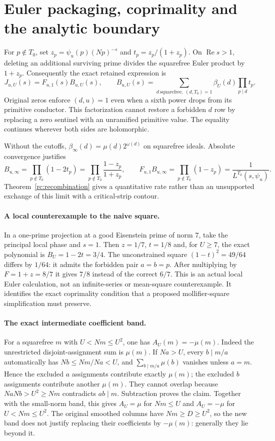 \section{Euler packaging, coprimality and the analytic boundary}
\label{rc:details}
For $p\notin T_0$, set $z_p=\psi_u(p)(Np)^{-s}$ and
$t_p=z_p/(1+z_p)$. On $\operatorname{Re}s>1$, deleting an additional
surviving prime divides the squarefree Euler product by $1+z_p$.
Consequently the exact retained expression is
\[
 J_{u,U}(s)=F_{u,1}(s)B_{u,U}(s),\qquad
 B_{u,U}(s)=\sum_{d\ \mathrm{squarefree},\ (d,T_0)=1}
                 \beta_U(d)\prod_{p\mid d}t_p.
\]
Original zeros enforce $(d,u)=1$ even when a sixth power drops from
its primitive conductor. This factorization cannot restore a forbidden
$d$ row by replacing a zero sentinel with an unramified primitive value.
The equality continues wherever both sides are holomorphic.

Without the cutoffs, $\beta_\infty(d)=\mu(d)2^{\omega(d)}$ on
squarefree ideals. Absolute convergence justifies
\[
 B_{u,\infty}=\prod_{p\notin T_0}(1-2t_p)
 =\prod_{p\notin T_0}\frac{1-z_p}{1+z_p},\qquad
 F_{u,1}B_{u,\infty}=\prod_{p\notin T_0}(1-z_p)
                   =\frac1{L^{T_0}(s,\psi_u)}.
\]
Theorem~\ref{rc:recombination} gives a quantitative rate rather than an
unsupported exchange of this limit with a critical-strip contour.

\paragraph{A local counterexample to the naive square.}
In a one-prime projection at a good Eisenstein prime of norm $7$, take
the principal local phase and $s=1$. Then $z=1/7$, $t=1/8$ and,
for $U\ge7$, the exact polynomial is $B_U=1-2t=3/4$.
The unconstrained square $(1-t)^2=49/64$ differs by $1/64$:
it admits the forbidden pair $a=b=p$. After multiplying by
$F=1+z=8/7$ it gives $7/8$ instead of the correct $6/7$.
This is an actual local Euler calculation, not an infinite-series or
mean-square counterexample. It identifies the exact coprimality condition
that a proposed mollifier-square simplification must preserve.

\paragraph{The exact intermediate coefficient band.}
For a squarefree $m$ with $U<Nm\le U^2$, one has $A_U(m)=-\mu(m)$.
Indeed the unrestricted disjoint-assignment sum is $\mu(m)$. If $Na>U$,
every $b\mid m/a$ automatically has $Nb\le Nm/Na<U$, and
$\sum_{b\mid m/a}\mu(b)$ vanishes unless $a=m$. Hence the excluded
$a$ assignments contribute exactly $\mu(m)$; the excluded $b$
assignments contribute another $\mu(m)$. They cannot overlap because
$NaNb>U^2\ge Nm$ contradicts $ab\mid m$. Subtraction proves the claim.
Together with the small-norm band, this gives $A_U=\mu$ for $Nm\le U$
and $A_U=-\mu$ for $U<Nm\le U^2$. The original smoothed columns have
$Nm\ge D\ge U^2$, so the new band does not justify replacing their
coefficients by $-\mu(m)$: generally they lie beyond it.

